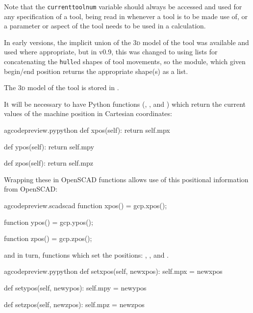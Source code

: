 \documentclass{ltxdoc}
\begin{document}
\noindent Note that the \verb|currenttoolnum| variable should always be accessed and used for any specification of a tool, being read in whenever a tool is to be made use of, or a parameter or aspect of the tool needs to be used in a calculation. %

In early versions, the implicit union of the \textsc{3d} model of the tool was available and used where appropriate, but in v0.9, this was changed to using lists for concatenating the \verb|hull|ed shapes of tool movements, so the module,  which given begin/end position returns the appropriate shape(s) as a list.

The \textsc{3d} model of the tool is stored in .

It will be necessary to have Python functions (, , and ) which return the current values of the machine position in Cartesian coordinates: 

\lstset{firstnumber=\thegcpy}
\begin{writecode}{a}{gcodepreview.py}{python}
    def xpos(self):
        return self.mpx

    def ypos(self):
        return self.mpy

    def zpos(self):
        return self.mpz

\end{writecode}
\addtocounter{gcpy}{9}

Wrapping these in OpenSCAD functions allows use of this positional information from OpenSCAD:

\lstset{firstnumber=\thegcpscad}
\begin{writecode}{a}{gcodepreview.scad}{scad}
function xpos() = gcp.xpos();

function ypos() = gcp.ypos();

function zpos() = gcp.zpos();

\end{writecode}
\addtocounter{gcpscad}{6}

\noindent and in turn, functions which set the positions: 
, 
, and
.%

\lstset{firstnumber=\thegcpy}
\begin{writecode}{a}{gcodepreview.py}{python}
    def setxpos(self, newxpos):
        self.mpx = newxpos

    def setypos(self, newypos):
        self.mpy = newypos

    def setzpos(self, newzpos):
        self.mpz = newzpos

\end{writecode}
\addtocounter{gcpy}{9}
\end{document}
